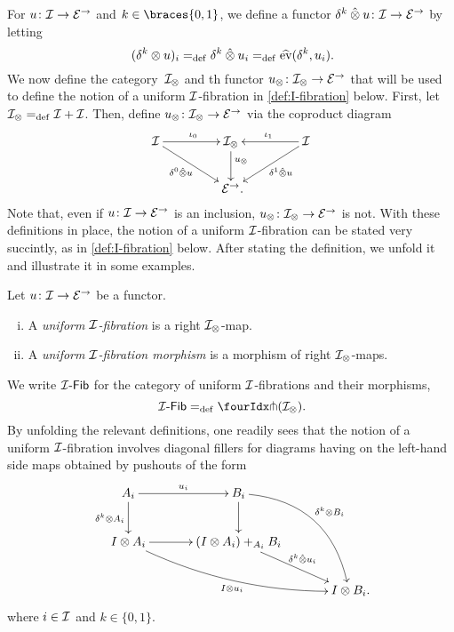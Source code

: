 \documentclass[reqno,10pt,a4paper,oneside]{amsart}
\begin{document}
For $u \co \cal{I} \to \catE^\to$ and $k \in \braces{0, 1}$, we define a functor $\kcyl \hatotimes u \co \cal{I} \to \catE^\to$ by letting
\[
(\kcyl \otimes u)_i \defeq \kcyl \hatotimes u_i  \defeq \widehat{\mathrm{ev}}(\kcyl, u_i)  \rlap{.}
\]
We now define the category~$\cal{I}_\otimes$ and th functor $u_\otimes \co \cal{I}_\otimes \to \catE^\to$ that will be used to define the notion of a uniform $\cal{I}$-fibration in \cref{def:I-fibration} below.
First, let $\cal{I}_\otimes \defeq \cal{I} + \cal{I}$.
Then, define $u_\otimes \co \cal{I}_\otimes \to \catE^\to$ via the coproduct diagram
\begin{equation}
\label{equ:u-tensor}
\begin{gathered}
\xymatrix@C+2em{
  \cal{I} \ar[r]^{\iota_0} \ar[dr]_-{\lcyl \hatotimes u} & \cal{I}_\otimes \ar[d]^(.4){u_\otimes} & \cal{I} \ar[dl]^-{\rcyl \hatotimes u} \ar[l]_{\iota_1} \\
  & \catE^\to
\rlap{.}}
\end{gathered}
\end{equation}
Note that, even if $u \co \cal{I} \to \catE^\to$ is an inclusion, $u_\otimes \co \cal{I}_\otimes \to \catE^\to$ is not.
With these definitions in place, the notion of a uniform $\cal{I}$-fibration can be stated very succintly, as in
\cref{def:I-fibration} below.
After stating the definition, we unfold it and illustrate it in some examples.

\begin{definition} \label{def:I-fibration}
Let $u \co \cal{I} \to \catE^\to$ be a functor.
\begin{enumerate}[(i)]
\item A \emph{uniform $\cal{I}$-fibration} is a right $\cal{I}_\otimes$-map.
\item A \emph{uniform $\cal{I}$-fibration morphism} is a morphism of right $\cal{I}_\otimes$-maps.
\end{enumerate}
\end{definition}



We write $\Fib{\cal{I}}$ for the category of uniform $\cal{I}$-fibrations and their morphisms, \ie
\[
\Fib{\cal{I}} \defeq \liftr{(\cal{I}_\otimes)} \rlap{.}
\]
By unfolding the relevant definitions, one readily sees that the notion of a uniform $\cal{I}$-fibration involves diagonal fillers for diagrams having on the left-hand side maps obtained by pushouts of the form
\begin{gather*}
\xymatrix@C=1.2cm{
  A_i \ar[r]^{u_i} \ar[d]_{\kcyl \otimes A_i} & B_i \ar@/^2pc/[ddr]^{\kcyl \otimes B_i} \ar[d] & \\
  \interval \otimes A_i \ar@/_1pc/[drr]_{\interval \otimes u_i} \ar[r] & (\interval \otimes A_i) +_{A_i} B_i \ar[dr]^-{\delta^k \hatotimes u_i} & \\
  & & \interval \otimes B_i
\rlap{.}}
\end{gather*}
where $i \in \cal{I}$ and $k \in \{0, 1 \}$.
\end{document}

